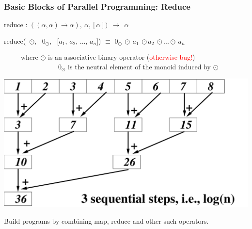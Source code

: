 \documentclass{beamer}
\newcommand{\red}[1]{\textcolor{Red}{{#1}}}
\renewcommand{\emph}[1]{\textcolor{CosGreen}{ #1}}
\newcommand{\emp}[1]{\textcolor{DikuRed}{ #1}}
\begin{document}
\begin{frame}[fragile,t]
   \frametitle{Basic Blocks of Parallel Programming: Reduce}

\bigskip

\emp{reduce} : $((\alpha, \alpha) \to \alpha),~ \alpha, [\alpha]) ~~\to~~ \alpha$

\smallskip

\emp{reduce}(~$\odot$, ~$0_\odot$, ~[$a_1$, $a_2$, ..., $a_n$]) $\equiv$ \emph{$0_\odot ~\odot ~a_1 ~\odot a_2 ~\odot ... \odot~ a_n$}

\smallskip

~~~~~where $\odot$ is an associative binary operator (\red{otherwise bug!})\\
~~~~~~~~~~~~~~~~$0_\odot$ is the neutral element of the monoid induced by $\odot$

\bigskip\pause

\begin{center} 
        \includegraphics[height=20ex]{img/day3/ReduceEg.pdf} 
\end{center} 

Build programs by combining \emp{map}, \emp{reduce} and other such operators.

\end{frame}
\end{document}
